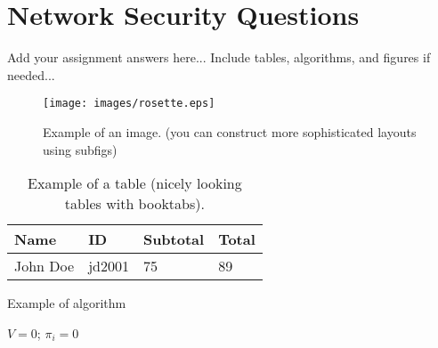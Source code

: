 \documentclass[format=acmsmall, review=false, screen=true]{acmart}
\begin{document}

%
%





\maketitle


\section{Network Security Questions}

Add your assignment answers here... Include tables, algorithms, and figures if needed...

\begin{figure}[h!]
  \centering
  \texttt{[image: images/rosette.eps]} 
  \caption{Example of an image. (you can construct more sophisticated layouts using subfigs)}
\end{figure}

\begin{table}[h]
  \centering
  \caption{Example of a table (nicely looking tables with booktabs).}
  \begin{tabular}{llll} %
    \toprule
    \textbf{Name} & \textbf{ID} & \textbf{Subtotal} & \textbf{Total} \\  
    \midrule
  John Doe & jd2001 & 75  & 89 \\
    \bottomrule
  \end{tabular}
\end{table}  

\begin{algorithm}[t]
  \footnotesize
  \caption{Example of algorithm}
  \label{algo1}

  $V=0$; $\pi_i=0$\;
\end{algorithm}
\end{document}
